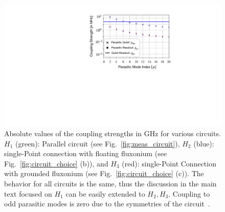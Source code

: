 \documentclass[prx,showpacs,notitlepage,twocolumn,superscriptaddress,nofootinbib,preprintnumbers,floatfix]{revtex4-2}
\begin{document}
\begin{figure}[htb]
    \centering
    \includegraphics[width=\linewidth]{Figures/Coupling_strength.pdf}
    \caption{Absolute values of the coupling strengths in GHz for various circuits. $H_1$ (green): Parallel circuit (see Fig.~\ref{fig:meas_circuit}), $H_2$ (blue): single-Point connection with floating fluxonium  (see Fig.~\ref{fig:circuit_choice} (b)), and $H_3$ (red): single-Point Connection with grounded fluxonium (see Fig.~\ref{fig:circuit_choice} (c)). The behavior for all circuits is the same, thus the discussion in the main text focused on $H_1$ can be easily extended to $H_2,H_3$. Coupling to odd parasitic modes is zero due to the symmetries of the circuit~\cite{viola2015collective}.}
    \label{fig:coupling-strength}
\end{figure}
\end{document}
